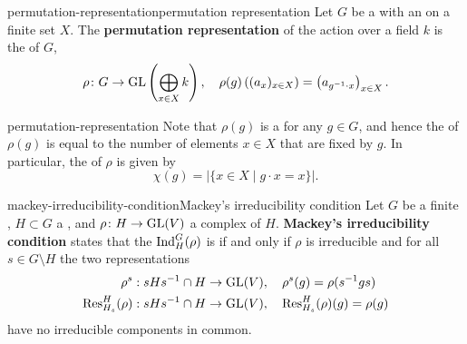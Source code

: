 \begin{topic}{permutation-representation}{permutation representation}
    Let $G$ be a  with an  on a finite set $X$. The \textbf{permutation representation} of the action over a field $k$ is the  of $G$,
    \[ \rho \colon G \to \textup{GL}\left( \bigoplus_{x \in X} k \right), \quad \rho(g)\left( (a_x)_{x \in X} \right) = \left( a_{g^{-1} \cdot x} \right)_{x \in X} . \]
\end{topic}

\begin{example}{permutation-representation}
    Note that $\rho(g)$ is a  for any $g \in G$, and hence the  of $\rho(g)$ is equal to the number of elements $x \in X$ that are fixed by $g$. In particular, the  of $\rho$ is given by
    \[ \chi(g) = |\{ x \in X \mid g \cdot x = x \}| . \]
\end{example}

\begin{topic}{mackey-irreducibility-condition}{Mackey's irreducibility condition}
    Let $G$ be a finite , $H \subset G$ a , and $\rho \colon H \to \textup{GL}(V)$ a complex  of $H$. \textbf{Mackey's irreducibility condition} states that the  $\textup{Ind}_H^G(\rho)$ is  if and only if $\rho$ is irreducible and for all $s \in G \setminus H$ the two representations
    \[ \begin{aligned}
        \rho^s &: s H s^{-1} \cap H \to \textup{GL}(V), \quad \rho^s(g) = \rho(s^{-1} g s) \\
        \textup{Res}_{H_s}^{H}(\rho) &: s H s^{-1} \cap H \to \textup{GL}(V) , \quad \textup{Res}_{H_s}^{H}(\rho)(g) = \rho(g)
    \end{aligned} \]
    have no irreducible components in common.
\end{topic}


